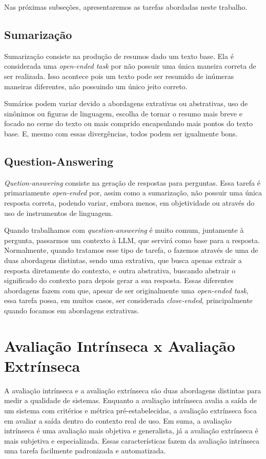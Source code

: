 \documentclass[cic,tc]{iiufrgs}
\begin{document}
Nas próximas subseções, apresentaremos as tarefas abordadas neste trabalho.

\subsection{Sumarização}
\label{sec:summ}
Sumarização consiste na produção de resumos dado um texto base. Ela é considerada uma \textit{open-ended task} por não possuir uma única maneira correta de ser realizada. Isso acontece pois um texto pode ser resumido de inúmeras maneiras diferentes, não possuindo um único jeito correto. 

Sumários podem variar devido a abordagens extrativas ou abstrativas, uso de sinônimos ou figuras de linguagem, escolha de tornar o resumo mais breve e focado no cerne do texto ou mais comprido encapsulando mais pontos do texto base. E, mesmo com essas divergências, todos podem ser igualmente bons.

\subsection{Question-Answering}
\label{sec:qa}
\textit{Quetion-answering} consiste na geração de respostas para perguntas. Essa tarefa é primariamente \textit{open-ended} por, assim como a sumarização, não possuir uma única resposta correta, podendo variar, embora menos, em objetividade ou através do uso de instrumentos de linguagem. 

Quando trabalhamos com \textit{question-answering} é muito comum, juntamente à pergunta, passarmos um contexto à LLM, que servirá como base para a resposta. Normalmente, quando tratamos esse tipo de tarefa, o fazemos através de uma de duas abordagens distintas, sendo uma extrativa, que busca apenas extrair a resposta diretamente do contexto, e outra abstrativa, buscando abstrair o significado do contexto para depois gerar a sua resposta. Essas diferentes abordagens fazem com que, apesar de ser originalmente uma \textit{open-ended task}, essa tarefa possa, em muitos casos, ser considerada \textit{close-ended}, principalmente quando focamos em abordagens extrativas.

\section{Avaliação Intrínseca x Avaliação Extrínseca}
\label{sec:avaliação-int-x-ext}
A avaliação intrínseca e a avaliação extrínseca são duas abordagens distintas para medir a qualidade de sistemas. Enquanto a avaliação intrínseca avalia a saída de um sistema com critérios e métrica pré-estabelecidas, a avaliação extrínseca foca em avaliar a saída dentro do contexto real de uso. Em suma, a avaliação intrínseca é uma avaliação mais objetiva e generalista, já a avaliação extrínseca é mais subjetiva e especializada. Essas características fazem da avaliação intrínseca uma tarefa facilmente padronizada e automatizada. 
\end{document}
